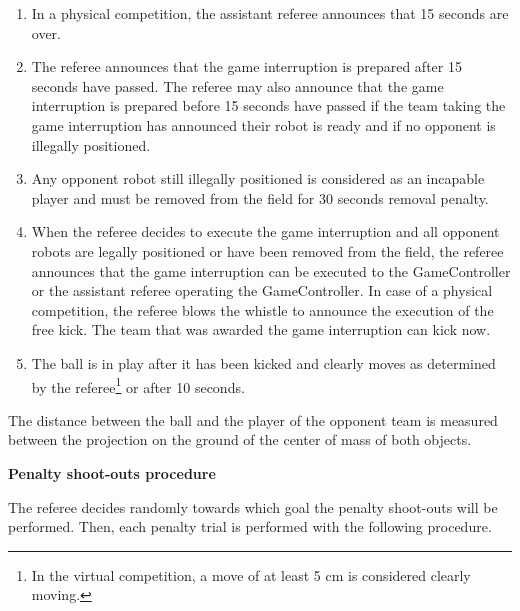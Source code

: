 \begin{enumerate}
      point. In the physical competition, the robot handler informs the referee if the robot is ready to take the free kick.
      Opponent robots must move to a position at least 0.75 m for KidSize and
      1.5m for AdultSize away from the ball.
      They are guaranteed 15 seconds to move away from the ball.
\item In a physical competition, the assistant referee announces that 15 seconds are over.
\item The referee announces that the game interruption is prepared after
      15 seconds have passed.
      The referee may also announce that the game interruption is
        prepared
      before 15 seconds have passed
      if the team taking the game interruption has
      announced their robot is ready and if no opponent is illegally positioned.
\item Any opponent robot still illegally positioned is considered as an
      incapable player and must be removed from the field for 30 seconds
      removal penalty.
\item When the referee decides to execute the game interruption
      and all opponent robots are
      legally positioned or have been removed from the field,
      the referee announces that the game interruption can be executed to
        the GameController or the assistant referee operating the GameController.
      In case of a physical competition, the referee blows the whistle to announce the execution of the free kick.
      The team that was awarded the game interruption
      can kick now.
\item The ball is in play after it has been
      kicked and clearly moves as determined by the referee\footnote{In the virtual competition, a move of at least 5 cm is considered clearly moving.} or after 10 seconds.
\end{enumerate}

The distance between the ball and the player of the opponent team is measured
between the projection on the ground of the center of mass of both
  objects.

\color{black}

\bigskip

{\bfseries Penalty shoot-outs procedure}

The referee decides randomly towards which goal the penalty shoot-outs will be
performed.
Then, each penalty trial is performed with the following procedure.
 
